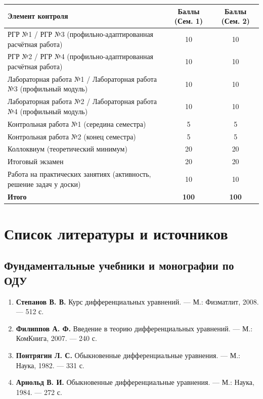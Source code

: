 \documentclass[12pt]{article}
\begin{document}
\vspace{0.3em}
\begin{center}
\small
\begin{tabular}{|p{9.5cm}|c|c|}
\hline
\textbf{Элемент контроля} & \textbf{Баллы (Сем. 1)} & \textbf{Баллы (Сем. 2)} \\
\hline
РГР №1 / РГР №3 (профильно-адаптированная расчётная работа) & 10 & 10 \\
РГР №2 / РГР №4 (профильно-адаптированная расчётная работа) & 10 & 10 \\
Лабораторная работа №1 / Лабораторная работа №3 (профильный модуль) & 10 & 10 \\
Лабораторная работа №2 / Лабораторная работа №4 (профильный модуль) & 10 & 10 \\
Контрольная работа №1 (середина семестра) & 5 & 5 \\
Контрольная работа №2 (конец семестра) & 5 & 5 \\
Коллоквиум (теоретический минимум) & 20 & 20 \\
Итоговый экзамен & 20 & 20 \\
Работа на практических занятиях (активность, решение задач у доски) & 10 & 10 \\
\hline
\textbf{Итого} & \textbf{100} & \textbf{100} \\
\hline
\end{tabular}
\end{center}

\newpage

\section*{Список литературы и источников}\label{app:refs}

\subsection*{Фундаментальные учебники и монографии по ОДУ}
\begin{enumerate}[nosep, leftmargin=1.8em]
    \item \textbf{Степанов В. В.} Курс дифференциальных уравнений. — М.: Физматлит, 2008. — 512 с.
    \item \textbf{Филиппов А. Ф.} Введение в теорию дифференциальных уравнений. — М.: КомКнига, 2007. — 240 с.
    \item \textbf{Понтрягин Л. С.} Обыкновенные дифференциальные уравнения. — М.: Наука, 1982. — 331 с.
    \item \textbf{Арнольд В. И.} Обыкновенные дифференциальные уравнения. — М.: Наука, 1984. — 272 с.
\end{enumerate}
\end{document}
